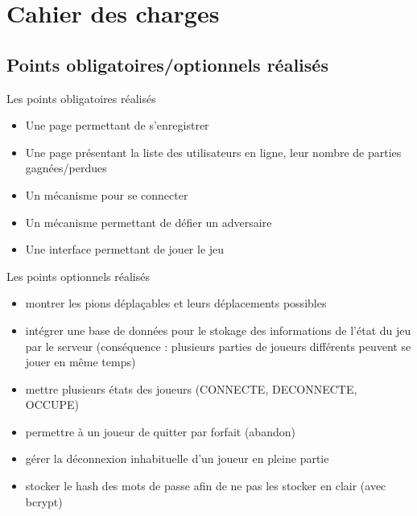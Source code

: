 \documentclass{beamer}
\begin{document}
\section{Cahier des charges}

\subsection{Points obligatoires/optionnels réalisés}

\begin{frame}
\begin{block}{Les points obligatoires réalisés} 
	\begin{itemize}
		[circle]
		\item Une page permettant de s'enregistrer
		\item Une page présentant la liste des utilisateurs en ligne, leur nombre de parties gagnées/perdues
		\item Un mécanisme pour se connecter
		\item Un mécanisme permettant de défier un adversaire
		\item Une interface permettant de jouer le jeu
	\end{itemize}
\end{block}
\end{frame}

\begin{frame}
\begin{block}{Les points optionnels réalisés} 
\begin{itemize}
	[circle]
	\item montrer les pions déplaçables et leurs déplacements possibles
	\item intégrer une base de données pour le stokage des informations de l'état du jeu par le serveur (conséquence : plusieurs parties de joueurs différents peuvent se jouer en même temps)
	\item mettre plusieurs états des joueurs (CONNECTE, DECONNECTE, OCCUPE)
	\item permettre à un joueur de quitter par forfait (abandon)
	\item gérer la déconnexion inhabituelle d'un joueur en pleine partie
	\item stocker le hash des mots de passe afin de ne pas les stocker en clair (avec bcrypt)
\end{itemize}
\end{block}
\end{frame}
\end{document}
